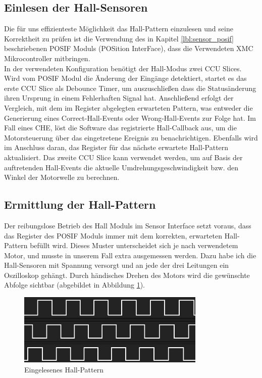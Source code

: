 \subsection{Einlesen der Hall-Sensoren}
Die für uns effizienteste Möglichkeit das Hall-Pattern einzulesen und seine Korrektheit zu prüfen ist die Verwendung des in Kapitel \ref{lbl:sensor_posif} beschriebenen POSIF Moduls (POSition InterFace), dass die Verwendeten XMC Mikrocontroller mitbringen.\\

\noindent
In der verwendeten Konfiguration benötigt der Hall-Modus zwei CCU Slices. Wird vom POSIF Modul die Änderung der Eingänge detektiert, startet es das erste CCU Slice als Debounce Timer, um auszuschließen dass die Statusänderung ihren Ursprung in einem Fehlerhaften Signal hat. Anschließend erfolgt der Vergleich, mit dem im Register abgelegten erwarteten Pattern, was entweder die Generierung eines Correct-Hall-Events oder Wrong-Hall-Events zur Folge hat. Im Fall eines CHE, löst die Software das registrierte Hall-Callback aus, um die Motorsteuerung über das eingetretene Ereignis zu benachrichtigen. Ebenfalls wird im Anschluss daran, das Register für das nächste erwartete Hall-Pattern aktualisiert. Das zweite CCU Slice kann verwendet werden, um auf Basis der auftretenden Hall-Events die aktuelle Umdrehungsgeschwindigkeit bzw. den Winkel der Motorwelle zu berechnen.

\subsection{Ermittlung der Hall-Pattern}
Der reibungslose Betrieb des Hall Moduls im Sensor Interface setzt voraus, dass das Register des POSIF Moduls immer mit dem korrekten, erwarteten Hall-Pattern befüllt wird. Dieses Muster unterscheidet sich je nach verwendetem Motor, und musste in unserem Fall extra ausgemessen werden. Dazu habe ich die Hall-Sensoren mit Spannung versorgt und an jede der drei Leitungen ein Oszilloskop gehängt. Durch händisches Drehen des Motors wird die gewünschte Abfolge sichtbar (abgebildet in Abbildung \ref{img:hall_pattern}).

\begin{figure}[ht]
\centering
\includegraphics[width=0.8\textwidth]{sensor/hall_pattern.jpg}
\caption{Eingelesenes Hall-Pattern}
\label{img:hall_pattern}
\end{figure}

